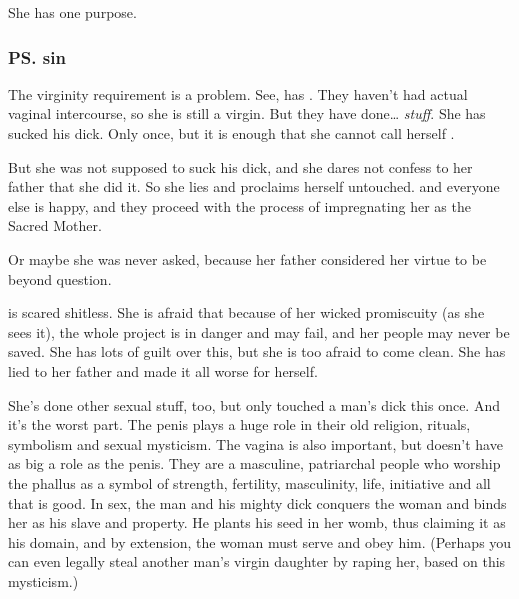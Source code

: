 She has one purpose. 






\subsubsection{\ps{\Ilu}{} sin}
The virginity requirement is a problem. See, \Ilu{} has . They haven't had actual vaginal intercourse, so she is still a virgin. But they have done\ldots{} \emph{stuff}. She has sucked his dick. Only once, but it is enough that she cannot call herself .

But she was not supposed to suck his dick, and she dares not confess to her father that she did it. So she lies and proclaims herself untouched. \Semiza{} and everyone else is happy, and they proceed with the process of impregnating her as the Sacred Mother. 

Or maybe she was never asked, because her father considered her virtue to be beyond question. 

\Ilu{} is scared shitless. She is afraid that because of her wicked promiscuity (as she sees it), the whole project is in danger and may fail, and her people may never be saved. She has lots of guilt over this, but she is too afraid to come clean. She has lied to her father and made it all worse for herself. 

She's done other sexual stuff, too, but only touched a man's dick this once. And it's the worst part. The penis plays a huge role in their old religion, rituals, symbolism and sexual mysticism. The vagina is also important, but doesn't have as big a role as the penis. They are a masculine, patriarchal people who worship the phallus as a symbol of strength, fertility, masculinity, life, initiative and all that is good. In sex, the man and his mighty dick conquers the woman and binds her as his slave and property. He plants his seed in her womb, thus claiming it as his domain, and by extension, the woman must serve and obey him. (Perhaps you can even legally steal another man's virgin daughter by raping her, based on this mysticism.)





